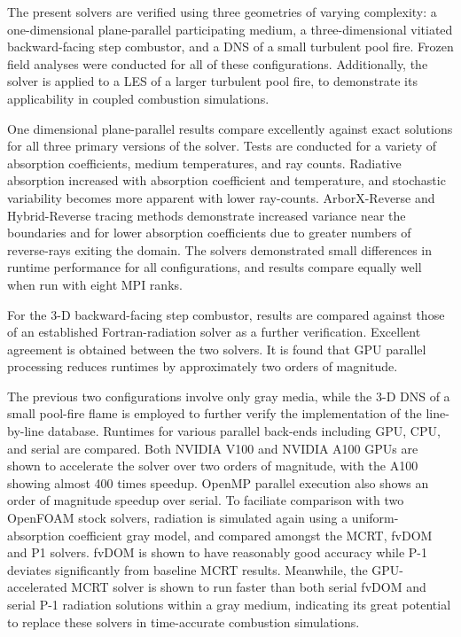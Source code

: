 The present solvers are verified using three geometries of varying complexity: a one-dimensional plane-parallel participating medium, a three-dimensional vitiated backward-facing step combustor, and a DNS of a small turbulent pool fire. Frozen field analyses were conducted for all of these configurations. Additionally, the solver is applied to a LES of a larger turbulent pool fire, to demonstrate its applicability in coupled combustion simulations.

One dimensional plane-parallel results compare excellently against exact solutions for all three primary versions of the solver. Tests are conducted for a variety of absorption coefficients, medium temperatures, and ray counts.
Radiative absorption increased with absorption coefficient and temperature, and stochastic variability becomes more apparent with lower ray-counts.
ArborX-Reverse and Hybrid-Reverse tracing methods demonstrate increased variance near the boundaries and for lower absorption coefficients due to greater numbers of reverse-rays exiting the domain.
The solvers demonstrated small differences in runtime performance for all configurations, and results compare equally well when run with eight MPI ranks.

For the 3-D backward-facing step combustor,
results are compared against those of an established Fortran-radiation solver as a further verification. Excellent agreement is obtained between the two solvers. It is found that GPU parallel processing reduces runtimes by approximately two orders of magnitude.

The previous two configurations involve only gray media, while the 3-D DNS of a small pool-fire flame is employed to further verify the implementation of the line-by-line database. Runtimes for various parallel back-ends including GPU, CPU, and serial are compared. Both NVIDIA V100 and NVIDIA A100 GPUs are shown to accelerate the solver over two orders of magnitude, with the A100 showing almost 400 times speedup. OpenMP parallel execution also shows an order of magnitude speedup over serial. To faciliate comparison with two OpenFOAM stock solvers, radiation is simulated again using a uniform-absorption coefficient gray model, and compared amongst the MCRT, fvDOM and P1 solvers. fvDOM is shown to have reasonably good accuracy while P-1 deviates significantly from baseline MCRT results. Meanwhile, the GPU-accelerated MCRT solver is shown to run faster than both serial fvDOM and serial P-1 radiation solutions within a gray medium, indicating its great potential to replace these solvers in time-accurate combustion simulations.

